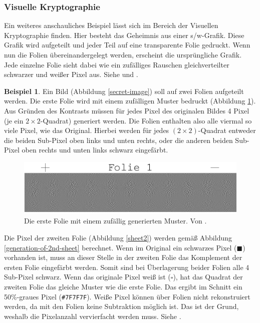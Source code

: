 \documentclass[12pt, a4paper, oneside, titlepage]{report}
\theoremstyle{definition}
\newtheorem{bsp}[lemma]{Beispiel}
\begin{document}
	\subsubsection{Visuelle Kryptographie}

	Ein weiteres anschauliches Beispiel lässt sich im Bereich der Visuellen Kryptographie finden. Hier besteht das Geheimnis aus einer s/w-Grafik. Diese Grafik wird aufgeteilt und jeder Teil auf eine transparente Folie gedruckt. Wenn nun die Folien übereinandergelegt werden, erscheint die ursprüngliche Grafik. Jede einzelne Folie sieht dabei wie ein zufälliges Rauschen gleichverteilter schwarzer und weißer Pixel aus. Siehe \cite{shamir_naor} und \cite{visual}.
	
	\begin{bsp}\label{ex:visual-sheets}
		Ein Bild (Abbildung \ref{secret-image}) soll auf zwei Folien aufgeteilt werden. Die erste Folie wird mit einem zufälligen Muster bedruckt (Abbildung \ref{sheet1}). Aus Gründen des Kontrasts müssen für jedes Pixel des originalen Bildes 4 Pixel (je ein $ 2 \times 2 $-Quadrat) generiert werden. Die Folien enthalten also alle viermal so viele Pixel, wie das Original. Hierbei werden für jedes $ (2 \times 2) $-Quadrat entweder die beiden Sub-Pixel oben links und unten rechts, oder die anderen beiden Sub-Pixel oben rechts und unten links schwarz eingefärbt.
		
		\begin{figure}[H]
			\centering
			\includegraphics[width=1.\textwidth]{images/visual2.png}
			\caption{Die erste Folie mit einem zufällig generierten Muster. Von \cite{visual}.}
			\label{sheet1}
		\end{figure}
		\noindent
		Die Pixel der zweiten Folie (Abbildung \ref{sheet2}) werden gemäß Abbildung \ref{generation-of-2nd-sheet} berechnet. Wenn im Original ein schwarzes Pixel ($ \blacksquare $) vorhanden ist, muss an dieser Stelle in der zweiten Folie das Komplement der ersten Folie eingefärbt werden. Somit sind bei Überlagerung beider Folien alle 4 Sub-Pixel schwarz. Wenn das originale Pixel weiß ist ($ \square $), hat das Quadrat der zweiten Folie das gleiche Muster wie die erste Folie. Das ergibt im Schnitt ein 50\%-graues Pixel (\texttt{\#7F7F7F}). Weiße Pixel können über Folien nicht rekonstruiert werden, da mit den Folien keine Subtraktion möglich ist. Das ist der Grund, weshalb die Pixelanzahl vervierfacht werden muss. Siehe \cite{visual}.
		

\end{bsp}
\end{document}
